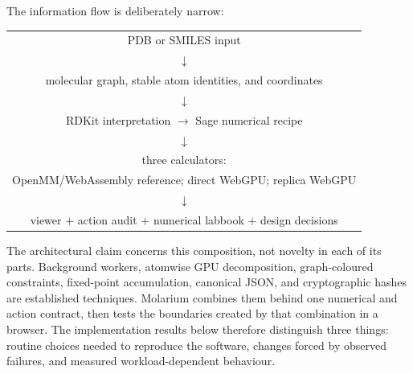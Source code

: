 The information flow is deliberately narrow:

\begin{center}
  \small
  \begin{tabular}{c}
    PDB or SMILES input \\
    $\downarrow$ \\
    molecular graph, stable atom identities, and coordinates \\
    $\downarrow$ \\
    RDKit interpretation $\rightarrow$ Sage numerical recipe \\
    $\downarrow$ \\
    three calculators: \\
    OpenMM/WebAssembly reference; direct WebGPU; replica WebGPU \\
    $\downarrow$ \\
    viewer $+$ action audit $+$ numerical labbook $+$ design decisions
  \end{tabular}
\end{center}

The architectural claim concerns this composition, not novelty in each of its
parts. Background workers, atomwise GPU decomposition, graph-coloured
constraints, fixed-point accumulation, canonical JSON, and cryptographic hashes
are established techniques. Molarium combines them behind one numerical and
action contract, then tests the boundaries created by that combination in a
browser. The implementation results below therefore distinguish three things:
routine choices needed to reproduce the software, changes forced by observed
failures, and measured workload-dependent behaviour.

